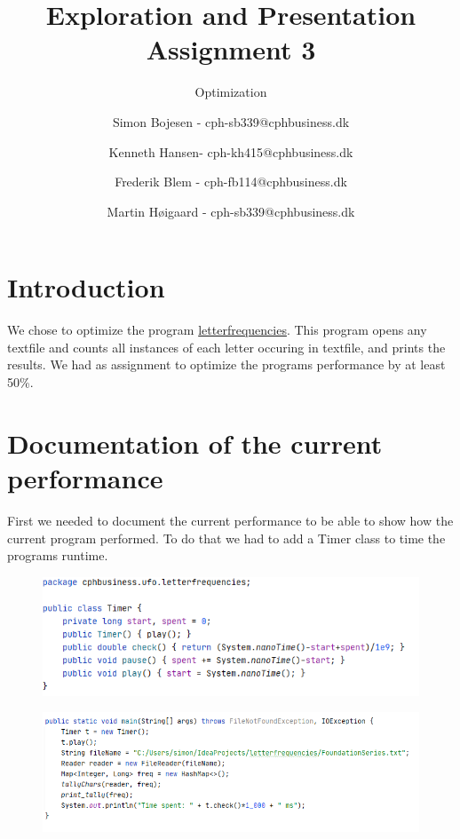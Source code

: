 \documentclass[parskip=full]{scrartcl}
\begin{document}
\begin{titlepage}
\title{Exploration and Presentation Assignment 3}
\subtitle{Optimization}
\author{Simon Bojesen - cph-sb339@cphbusiness.dk
    \and Kenneth Hansen- cph-kh415@cphbusiness.dk
    \and Frederik Blem - cph-fb114@cphbusiness.dk
    \and Martin Høigaard - cph-sb339@cphbusiness.dk}
\maketitle
\thispagestyle{empty}
\end{titlepage}
\clearpage

\section{Introduction}
\label{sec:introduction} %
    We chose to optimize the program \href{https://github.com/CPHBusinessSoftUFO/letterfrequencies}{letterfrequencies}.
    This program opens any textfile and counts all instances of each letter occuring in textfile, and prints the results. We had as assignment to optimize the programs performance by at least 50\%.
\clearpage

\section{Documentation of the current performance}
\label{sec:currentdoc} 
    First we needed to document the current performance to be able to show how the current program performed. To do that we had to add a Timer class to time the programs runtime.

\begin{figure}[!h]
    \centering
    \includegraphics[width=\textwidth]{Timer.PNG}
\end{figure}


\begin{figure}[!h]
    \centering
    \includegraphics[width=\textwidth]{unchanged_code_added_timer.png}
\end{figure}
\end{document}

